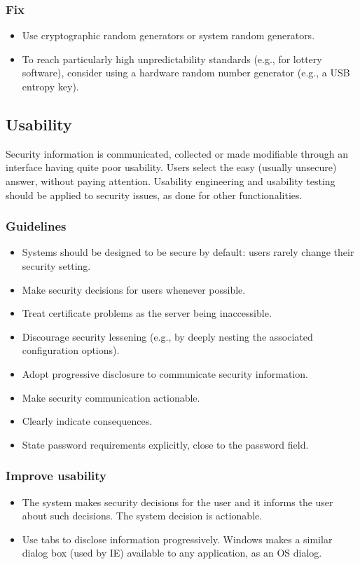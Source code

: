 \documentclass[a4paper, 10pt, titlepage]{article}
\begin{document}
\subsubsection*{Fix}
\begin{itemize}
\item Use cryptographic random generators or system random generators.
\item To reach particularly high unpredictability standards (e.g., for lottery software), consider using a hardware random number generator (e.g., a USB entropy key).
\end{itemize}


\subsection{Usability}
Security information is communicated, collected or made modifiable through an interface having quite poor usability. Users select the easy (usually unsecure) answer, without paying attention.
Usability engineering and usability testing should be applied to security issues, as done for other functionalities.

\subsubsection*{Guidelines}
\begin{itemize}
\item Systems should be designed to be secure by default: users rarely change their security setting.
\item Make security decisions for users whenever possible.
\item Treat certificate problems as the server being inaccessible.
\item Discourage security lessening (e.g., by deeply nesting the associated configuration options).
\item Adopt progressive disclosure to communicate security information.
\item Make security communication actionable.
\item Clearly indicate consequences.
\item State password requirements explicitly, close to the password field.
\end{itemize}

\subsubsection*{Improve usability}
\begin{itemize}
\item The system makes security decisions for the user and it informs the user about such decisions. The system decision is actionable.
\item Use tabs to disclose information progressively. Windows makes a similar dialog box (used by IE) available to any application, as an OS dialog.
\end{itemize}
\end{document}
